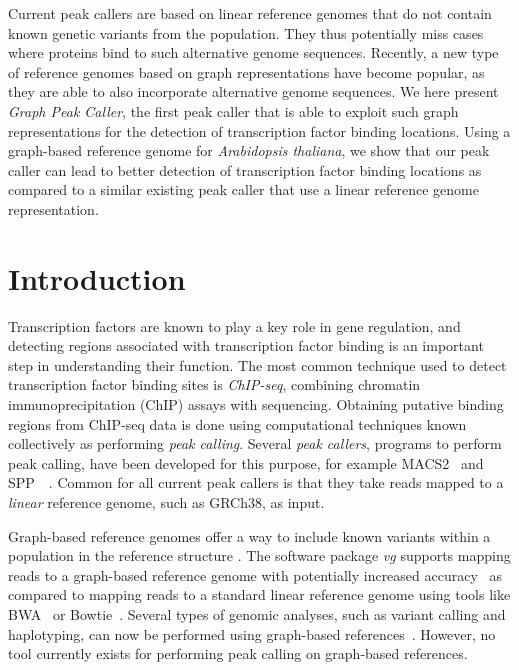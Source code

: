 \documentclass[10pt,letterpaper]{article}
\begin{document}
Current peak callers are based on linear reference genomes that do not contain known genetic variants from the population.
They thus potentially miss cases where proteins bind to such alternative genome sequences.
Recently, a new type of reference genomes based on graph representations have become popular, as they are able to also incorporate alternative genome sequences.
We here present \emph{Graph Peak Caller}, the first peak caller that is able to exploit such graph representations for the detection of transcription factor binding locations.
Using a graph-based reference genome for \emph{Arabidopsis thaliana}, we show that our peak caller can lead to better detection of transcription factor binding locations as compared to a similar existing peak caller that use a linear reference genome representation.

\linenumbers

\section*{Introduction}
Transcription factors are known to play a key role in gene regulation, and detecting regions associated with transcription factor binding is an important step in understanding their function. The most common technique used to detect transcription factor binding sites is \emph{ChIP-seq}, combining chromatin immunoprecipitation (ChIP) assays with sequencing. Obtaining putative binding regions from ChIP-seq data is done using computational techniques known collectively as performing \emph{peak calling}. Several \emph{peak callers}, programs to perform peak calling, have been developed for this purpose, for example MACS2~\cite{macs} and SPP~\cite{spp}~\cite{peak_caller_review}. Common for all current peak callers is that they take reads mapped to a \emph{linear} reference genome, such as GRCh38, as input. 

Graph-based reference genomes offer a way to include known variants within a population in the reference structure \cite{graph_evolution}. The software package \emph{vg} supports mapping reads to a graph-based reference genome with potentially increased accuracy~\cite{vg, genome_graphs} as compared to mapping reads to a standard linear reference genome using tools like BWA~\cite{bwa_mem} or Bowtie~\cite{bowtie}.
Several types of genomic analyses, such as variant calling and haplotyping, can now be performed using graph-based references~\cite{vg, genome_graphs}. However, no tool currently exists for performing peak calling on graph-based references. 
\end{document}
